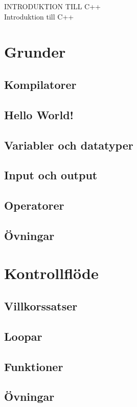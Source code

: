 \documentclass[10pt,a4paper]{article}
\begin{document}
\Large{INTRODUKTION TILL C++}
\\
\small{Introduktion till C++}


\section{Grunder}
	
\subsection{Kompilatorer}

\subsection{Hello World!}

\subsection{Variabler och datatyper}

\subsection{Input och output}

\subsection{Operatorer}

\subsection{Övningar}


\section{Kontrollflöde}
\subsection{Villkorssatser}

\subsection{Loopar}

\subsection{Funktioner}

\subsection{Övningar}

\end{document}
